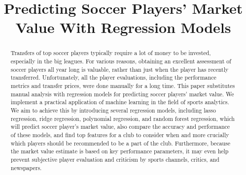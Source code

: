 \documentclass[conference]{IEEEtran}
\begin{document}
\title{%
    Predicting Soccer Players’ Market Value With Regression Models}


\author{
\and
{}
\and
{}
\and
{}
}

\maketitle

\begin{abstract}
Transfers of top soccer players typically require a lot of money to be invested, especially in the big leagues. For various reasons, obtaining an excellent assessment of soccer players all year long is valuable, rather than just when the player has recently transferred. Unfortunately, all the player evaluations, including the performance metrics and transfer prices, were done manually for a long time. This paper substitutes manual analysis with regression models for predicting soccer players' market value. We implement a practical application of machine learning in the field of sports analytics. We aim to achieve this by introducing several regression models, including lasso regression, ridge regression, polynomial regression, and random forest regression, which will predict soccer player's market value, also compare the accuracy and performance of these models, and find top features for a club to consider when and more crucially which players should be recommended to be a part of the club. Furthermore, because the market value estimate is based on key performance parameters, it may even help prevent subjective player evaluation and criticism by sports channels, critics, and newspapers. 
\end{abstract}
\end{document}

